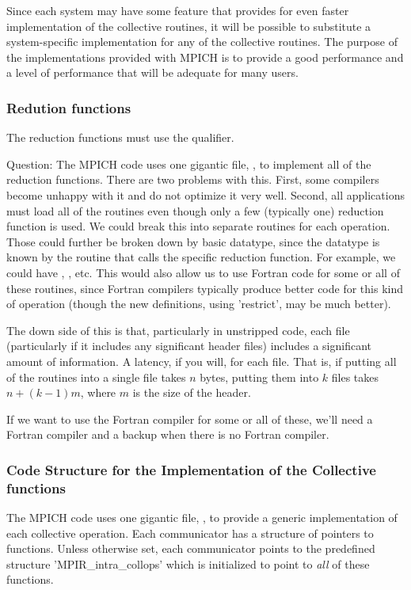 \documentclass{article}
\begin{document}
Since each system may have some feature that provides for even faster
implementation of the collective routines, it will be possible to
substitute a system-specific implementation for any of the collective
routines.  The purpose of the implementations provided with MPICH is
to provide a good performance and a level of performance that will be adequate
for many users.  

\subsubsection{Redution functions}
The reduction functions must use the  qualifier.

Question:
The MPICH code uses one gigantic file, , to implement
all of the reduction functions.  There are two problems with this.
First, some compilers become unhappy with it and do not optimize it
very well.  Second, all applications must load all of the routines
even though only a few (typically one) reduction function is used.  We
could break this into separate routines for each operation.  Those
could further be broken down by basic datatype, since the datatype is
known by the routine that calls the specific reduction function.  
For example, we could have ,
, etc.  This would also allow us to use Fortran
code for some or all of these routines, since Fortran compilers
typically produce better code for this kind of operation (though the
new definitions, using 'restrict', may be much better).

The down side of this is that, particularly in unstripped code, each
file (particularly if it includes any significant header files)
includes a significant amount of information.  A latency, if you will,
for each file.  That is, if putting all of the routines into a single
file takes $n$ bytes, putting them into $k$ files takes $n + (k-1)m$,
where $m$ is the size of the header.  

If we want to use the Fortran compiler for some or all of these, we'll
need a Fortran compiler and a backup when there is no Fortran compiler.

\subsubsection{Code Structure for the Implementation of the Collective
  functions} 

The MPICH code uses one gigantic file, , to provide a
generic implementation of each collective operation.  Each
communicator has a structure of pointers to functions.  Unless
otherwise set, each communicator points to the predefined structure
'MPIR_intra_collops' which is initialized to point to \emph{all} of
these functions.  
\end{document}
